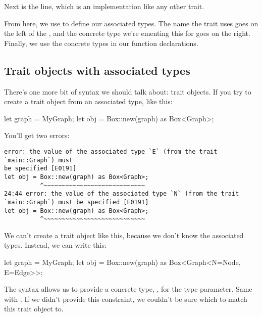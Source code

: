 \blank

Next is the  line, which is an implementation like any other trait.

\blank

From here, we use \code{=} to define our associated types. The name the trait uses goes on the left of the \code{=}, and the concrete 
type we're ementing this for goes on the right. Finally, we use the concrete types in our function declarations.

\subsection*{Trait objects with associated types}

There's one more bit of syntax we should talk about: trait objects. If you try to create a trait object from an associated type, like this:

\begin{rustc}
let graph = MyGraph;
let obj = Box::new(graph) as Box<Graph>;
\end{rustc}

You'll get two errors:

\begin{verbatim}
error: the value of the associated type `E` (from the trait `main::Graph`) must
be specified [E0191]
let obj = Box::new(graph) as Box<Graph>;
          ^~~~~~~~~~~~~~~~~~~~~~~~~~~~~
24:44 error: the value of the associated type `N` (from the trait
`main::Graph`) must be specified [E0191]
let obj = Box::new(graph) as Box<Graph>;
          ^~~~~~~~~~~~~~~~~~~~~~~~~~~~~
\end{verbatim}

We can't create a trait object like this, because we don't know the associated types. Instead, we can write this:

\begin{rustc}
let graph = MyGraph;
let obj = Box::new(graph) as Box<Graph<N=Node, E=Edge>>;
\end{rustc}

The  syntax allows us to provide a concrete type, , for the  type parameter. Same with . 
If we didn't provide this constraint, we couldn't be sure which  to match this trait object to.
